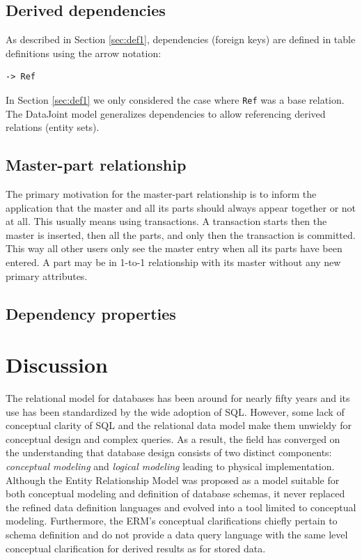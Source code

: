 \documentclass[letter,10pt]{article}
\begin{document}
\subsection{Derived dependencies}
As described in Section \ref{sec:def1}, dependencies (foreign keys) are defined in table definitions using the arrow notation:
\begin{lstlisting}
-> Ref
\end{lstlisting}
In Section \ref{sec:def1} we only considered the case where \lstinline$Ref$ was a base relation. 
The DataJoint model generalizes dependencies to allow referencing derived relations (entity sets).

\subsection{Master-part relationship}
The primary motivation for the master-part relationship is to inform the application that the master and all its parts should always appear together or not at all.  
This usually means using transactions.  
A transaction starts then the master is inserted, then all the parts, and only then the transaction is committed.  
This way all other users only see the master entry when all its parts have been entered.
A part may be in 1-to-1 relationship with its master without any new primary attributes.

\subsection{Dependency properties}

\section{Discussion}
The relational model for databases has been around for nearly fifty years and its use has been standardized by the wide adoption of SQL.
However, some lack of conceptual clarity of SQL and the relational data model make them unwieldy for conceptual design and complex queries.
As a result, the field has converged on the understanding that database design consists of two distinct components: \emph{conceptual modeling} and \emph{logical modeling} leading to physical implementation. 
Although the Entity Relationship Model was proposed as a model suitable for both conceptual modeling and definition of database schemas, it never replaced the refined data definition languages and evolved into a tool limited to conceptual modeling.  
Furthermore, the ERM's conceptual clarifications chiefly pertain to schema definition and do not provide a data query language with the same level conceptual clarification for derived results as for stored data.
\end{document}
